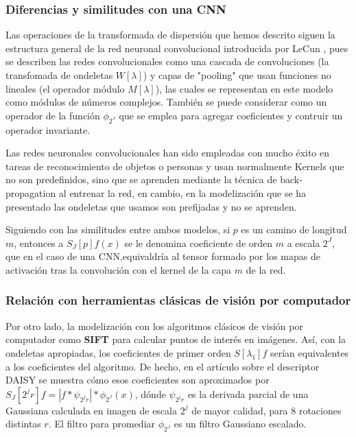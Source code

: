 \subsubsection{Diferencias y similitudes con una CNN}


Las operaciones de la transformada de dispersión que hemos descrito siguen la estructura general de la red neuronal convolucional introducida por LeCun \cite{lecun2015deep}, pues se describen las redes convolucionales como una cascada de convoluciones (la transfomada de ondeletas $W[\lambda]$) y capas de "pooling" que usan funciones no lineales (el operador módulo $M[\lambda]$), las cuales se representan en este modelo como módulos de números complejos. También se puede considerar como un operador de  la función $\phi_{2^J}$ que se emplea para agregar coeficientes y contruir un operador invariante.

\medskip

\noindent Las redes neuronales convolucionales han sido empleadas con mucho éxito en tareas de reconocimiento de objetos o personas y usan normalmente Kernels que no son predefinidos, sino que se aprenden mediante la técnica de back-propagation al entrenar la red, en cambio, en la modelización que se ha presentado las ondeletas que usamos son prefijadas y no se aprenden.

\medskip

\noindent Siguiendo con las similitudes entre ambos modelos, si $p$ es un camino de longitud $m$, entonces a $S_J[p] f(x)$ se le denomina coeficiente de orden $m$ a escala $2^J$, que en el caso de una CNN,equivaldría al tensor formado por los mapas de activación tras la convolución con el kernel de la capa $m$ de la red. 

\medskip


\subsubsection{Relación con herramientas clásicas de visión por computador}
\noindent Por otro lado, la modelización  con los algoritmos clásicos de visión por computador como \textbf{SIFT}  \cite{DistinctiveImageFeatures} para calcular puntos de interés en imágenes. Así, con la ondeletas apropiadas, los coeficientes de primer orden $S[\lambda_1] f$ serían equivalentes a los coeficientes del algoritmo. De hecho, en el artículo sobre el descriptor DAISY \cite{Daisy} se muestra cómo esos coeficientes son aproximados por $S_J[2^j r] f= | f \ast \psi_{2^j r} | \ast \phi_{2^J}(x)$, dónde $\psi_{2^j r}$ es la derivada parcial de una Gaussiana calculada en imagen de escala $2^j$ de mayor calidad, para 8 rotaciones distintas $r$. El filtro para promediar $\phi_{2^J}$ es un filtro Gaussiano escalado.


